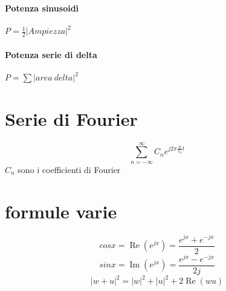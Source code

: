 \documentclass[12pt,a4paper,]{article}
\begin{document}
  \paragraph{Potenza sinusoidi}
 $P = \frac{1}{2} |Ampiezza|^2$
   \paragraph{Potenza serie di delta}
 $P =  \sum |area \:delta|^{2}$
 \section{Serie di Fourier}
 \begin{equation}
 \sum_{n=-\infty}^{\infty}  C_{n} e^{j2\pi\frac{n}{T_{0}}t}
  \end{equation}
  $C_{n}$ sono i coefficienti di Fourier
  
 \section{formule varie}
 \begin{equation}
 cos x = \operatorname{Re} \left(e^{jx}\right) =\frac{e^{jx} + e^{-jx}}{2}
  \end{equation}
   \begin{equation}
sin x = \operatorname{Im} \left(e^{jx}\right) =\frac{e^{jx} - e^{-jx}}{2j}
 \end{equation}
\begin{equation}
|w+u|^{2} = |w|^{2} + |u|^{2} +2\operatorname{Re}(wu)
\end{equation}
 
 
\end{document}
